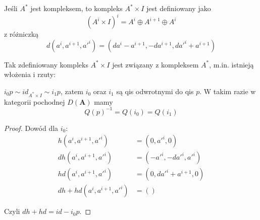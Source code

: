\begin{definition}
  Jeśli $A^*$ jest kompleksem, to kompleks $A^*\times I$ jest definiowany jako 
  $$(A^i\times I)^i=A^i\oplus A^{i+1}\oplus A^i$$
  z różniczką
  $$d(a^i, a^{i+1}, a'^i)=(da^i-a^{i+1}, -da^{i+1}, da'^i+a^{i+1})$$
\end{definition}

Tak zdefiniowany kompleks $A^*\times I$ jest związany z kompleksem $A^*$, m.in. istnieją włożenia i rzuty:
\begin{center}\end{center}

\begin{lemma}
  $i_0p\sim id_{A^*\times I}\sim i_1p$, zatem $i_0$ oraz $i_1$ są qis odwrotnymi do qis $p$. W takim razie w kategorii pochodnej $D(\mathbf{A})$ mamy 
  $$Q(p)^{-1}=Q(i_0)=Q(i_1)$$
\end{lemma}

\begin{proof}
  Dowód dla $i_0$:
  \begin{align*}
    h(a^i, a^{i+1}, a'^i)&=(0, a'^i, 0)\\ 
    dh(a^i, a^{i+1}, a'^i) &= (-a'^i, -da'^i, a'^i)\\ 
    hd(a^i, a^{i+1}, a'^i) &= (0, da'^i+ a^{i+1}, 0)\\ 
    dh+hd (a^i, a^{i+1}, a'^i)&=()
  \end{align*}


\begin{center}\end{center}
Czyli $dh+hd=id-i_0p$.

\end{proof}

